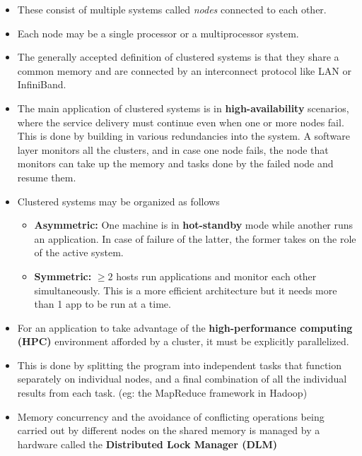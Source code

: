 \documentclass{article}
\theoremstyle{plain}
\theoremstyle{definition}
\begin{document}
\begin{itemize}
    \item These consist of multiple systems called \textit{nodes} connected to each other.
    
    \item Each node may be a single processor or a multiprocessor system. 
    
    \item The generally accepted definition of clustered systems is that they share a common memory and are connected by an interconnect protocol like LAN or InfiniBand.
    
    \item The main application of clustered systems is in \textbf{high-availability} scenarios, where the service delivery must continue even when one or more nodes fail. This is done by building in various redundancies into the system. A software layer monitors all the clusters, and in case one node fails, the node that monitors can take up the memory and tasks done by the failed node and resume them. 
    
    \item Clustered systems may be organized as follows
    \begin{itemize}
        \item \textbf{Asymmetric:} One machine is in \textbf{hot-standby} mode while another runs an application. In case of failure of the latter, the former takes on the role of the active system. 
        
        \item \textbf{Symmetric:} $\geq 2$ hosts run applications and monitor each other simultaneously. This is a more efficient architecture but it needs more than 1 app to be run at a time. 
    \end{itemize}
    
    \item For an application to take advantage of the \textbf{high-performance computing (HPC)} environment afforded by a cluster, it must be explicitly parallelized. 
    
    \item This is done by splitting the program into independent tasks that function separately on individual nodes,  and a final combination of all the individual results from each task.
    (eg: the MapReduce framework in Hadoop)
    
    \item Memory concurrency and the avoidance of conflicting operations being carried out by different nodes on the shared memory is managed by a hardware called the \textbf{Distributed Lock Manager (DLM)}
\end{itemize}
\end{document}
